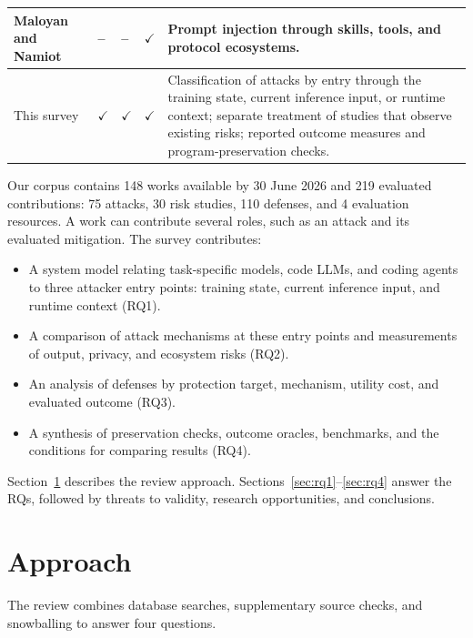 \documentclass[acmsmall,screen,review,nonacm]{acmart}
\begin{document}
{\begin{table}[tp]
\begin{tabular}{@{}L{2.00cm}C{2cm}C{1.05cm}C{1.15cm}L{7.00cm}@{}}
Maloyan and Namiot~\cite{maloyan2026promptinjection} &
-- &
-- &
\(\checkmark\) &
Prompt injection through skills, tools, and protocol ecosystems. \\
\midrule

This survey &
\(\checkmark\) &
\(\checkmark\) &
\(\checkmark\) &
Classification of attacks by entry through the training state, current inference input, or runtime context; separate treatment of studies that observe existing risks; reported outcome measures and program-preservation checks. \\

\bottomrule
\end{tabular}
\end{table}
}

Our corpus contains 148 works available by 30 June 2026 and 219 evaluated contributions: 75 attacks, 30 risk studies, 110 defenses, and 4 evaluation resources. A work can contribute several roles, such as an attack and its evaluated mitigation. The survey contributes:
\begin{itemize}
\item A system model relating task-specific models, code LLMs, and coding agents to three attacker entry points: training state, current inference input, and runtime context (RQ1).
\item A comparison of attack mechanisms at these entry points and measurements of output, privacy, and ecosystem risks (RQ2).
\item An analysis of defenses by protection target, mechanism, utility cost, and evaluated outcome (RQ3).
\item A synthesis of preservation checks, outcome oracles, benchmarks, and the conditions for comparing results (RQ4).
\end{itemize}

Section~\ref{sec:method} describes the review approach. Sections~\ref{sec:rq1}--\ref{sec:rq4} answer the RQs, followed by threats to validity, research opportunities, and conclusions.

\section{Approach}
\label{sec:method}

The review combines database searches, supplementary source checks, and snowballing to answer four questions.
\end{document}

